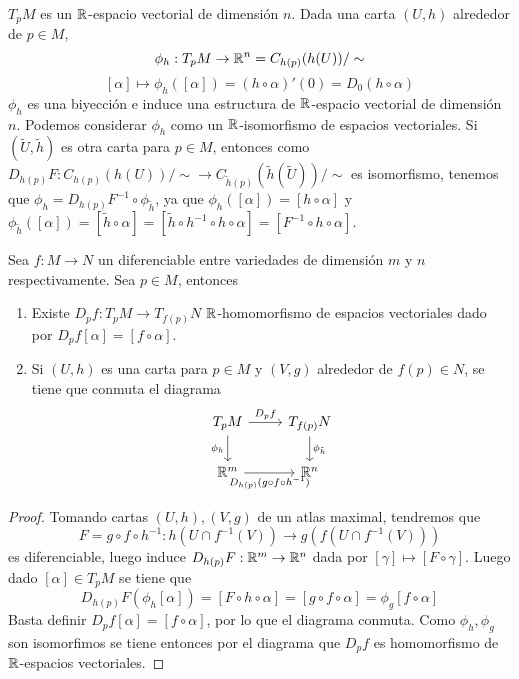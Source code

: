 \documentclass[CV.tex]{subfiles}
\begin{document}
\begin{nota}
\item $T_pM$ es un $\mathbb{R}$-espacio vectorial de dimensión $n$. Dada una carta $(U,h)$ alrededor de $p\in M$,
\[
\phi_h:T_pM\to \mathbb{R}^n=C_{h(p)}(h(U))/\sim 
\]
\[
[\alpha]\mapsto \phi_h([\alpha])=(h\circ\alpha)'(0)=D_0(h\circ\alpha)
\]
$\phi_h$ es una biyección e induce una estructura de $\mathbb{R}$-espacio vectorial de dimensión $n$. Podemos considerar $\phi_h$ como un $\mathbb{R}$-isomorfismo de espacios vectoriales. Si $(\widetilde{U},\tilde{h})$ es otra carta para $p\in M$, entonces como $D_{h(p)}F:C_{h(p)}(h(U))/\sim\to C_{\tilde{h}(p)}(\tilde{h}(\widetilde{U}))/\sim$ es isomorfismo, tenemos que $\phi_h=D_{h(p)}F^{-1}\circ \phi_{\tilde{h}}$, ya que $\phi_h([\alpha])=[h\circ\alpha]$ y $\phi_{\tilde{h}}([\alpha])=[\tilde{h}\circ\alpha]=[\tilde{h} \circ h^{-1}\circ h\circ \alpha]=[F^{-1} \circ h \circ \alpha]$. 
\end{nota}

\begin{lemma}
Sea $f:M\to N$ un diferenciable entre variedades de dimensión $m$ y $n$ respectivamente. Sea $p\in M$, entonces
\begin{enumerate}
\item Existe $D_pf:T_pM\to T_{f(p)}N$ $\mathbb{R}$-homomorfismo de espacios vectoriales dado por $D_pf[\alpha]=[f\circ\alpha]$.
\item Si $(U,h)$ es una carta para $p\in M$ y $(V,g)$ alrededor de $f(p)\in N$, se tiene que conmuta el diagrama
\[
\begin{tikzcd}
T_pM\arrow[r, "D_pf"]\arrow[d, "\phi_h"'] & T_{f(p)}N\arrow[d, "\phi_{\tilde{h}}"]\\
\R^m\arrow[r, "D_{h(p)}(g\circ f\circ h^{-1})"'] & \R^n
\end{tikzcd}
\]
\end{enumerate}
\end{lemma}

\begin{proof}
 Tomando cartas $(U,h),(V,g)$ de un atlas maximal, tendremos que
\[
F=g\circ f\circ h^{-1}:h(U\cap f^{-1}(V))\to g(f(U\cap f^{-1}(V)))
\]
es diferenciable, luego induce $D_{h(p)}F:\mathbb{R}^m\to\mathbb{R}^n$  dada por $[\gamma]\mapsto[F\circ\gamma]$. Luego dado $[\alpha]\in T_pM$ se tiene que 
\[
D_{h(p)}F(\phi_h[\alpha])=[F\circ h\circ\alpha]=[g\circ f\circ \alpha]=\phi_g[f\circ\alpha]
\]
Basta definir $D_pf[\alpha]=[f\circ \alpha]$, por lo que el diagrama conmuta. Como $\phi_h,\phi_g$ son isomorfimos se tiene entonces por el diagrama que $D_pf$ es homomorfismo de $\mathbb{R}$-espacios vectoriales.
\end{proof}
\end{document}

